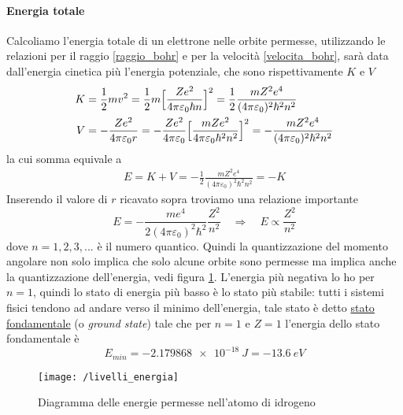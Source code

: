 \paragraph{Energia totale} Calcoliamo l'energia totale di un elettrone nelle orbite permesse, utilizzando le relazioni per il raggio \ref{raggio_bohr} e per la velocità \ref{velocita_bohr}, sarà data dall'energia cinetica più l'energia potenziale, che sono rispettivamente $K$ e $V$
\begin{equation}
\begin{split}
K & = \frac{ 1}{2 } m v^2 = \frac{ 1}{2 } m \Bigl[ \frac{ Z e^2}{4\pi \varepsilon_0 \hbar n } \Bigr]^2 = \frac{ 1}{2 } \frac{ m Z^2 e^4 }{(4\pi \varepsilon_0)^2 \hbar^2 n^2 } \\
V & = - \frac{ Z e^2}{4 \pi \varepsilon_0 r } = - \frac{ Z e^2}{4\pi \varepsilon_0 } \Bigl[ \frac{ m Z e^2}{4\pi \varepsilon_0 \hbar^2 n^2 } \Bigr]^2 = - \frac{ m Z^2 e^4}{(4\pi \varepsilon_0)^2 \hbar^2 n^2 }
\end{split}
\end{equation}
la cui somma equivale a
\begin{equation}
\begin{split}
E = K + V = - \frac{ 1}{2 } \frac{ m Z^2 e^4 }{(4\pi \varepsilon_0)^2 \hbar^2 n^2 } = - K
\end{split}
\end{equation}
Inserendo il valore di $r$ ricavato sopra troviamo una relazione importante
\begin{equation}
E = - \frac{ m e^4}{2 (4\pi \varepsilon_0)^2 \hbar^2 } \frac{ Z^2}{n^2 } \quad\Rightarrow\quad E \propto \frac{ Z^2}{n^2 }
\label{energia_quantizzata}
\end{equation}
dove $n=1,2,3,...$ è il numero quantico.
Quindi la quantizzazione del momento angolare non solo implica che solo alcune orbite sono permesse ma implica anche la quantizzazione dell'energia, vedi figura \ref{energie_permesse}.
L'energia più negativa lo ho per $n=1$, quindi lo stato di energia più basso è lo stato più stabile: tutti i sistemi fisici tendono ad andare verso il minimo dell'energia, tale stato è detto \underline{stato fondamentale} (o \textit{ground state})
tale che per $n=1$ e $Z=1$ l'energia dello stato fondamentale è
\begin{equation}
E_{min} = -\SI{2.179868e-18}{J} = - \SI{13.6}{eV}
\label{energia_fondamentale}
\end{equation}
\begin{figure}[h]
\centering
\texttt{[image: /livelli\_energia]}
\caption{Diagramma delle energie permesse nell'atomo di idrogeno}
\label{energie_permesse}
\end{figure}
%

